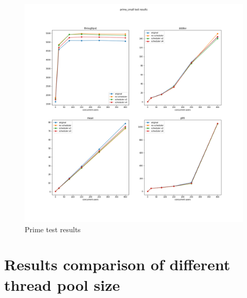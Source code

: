 \begin{figure}[htbp]
	\begin{center}
		\includegraphics[scale=0.3]{figures/prime_small test results.png}
	\end{center}
	\caption{Prime test results}
	\label{prime_small_test_results}
\end{figure}


\section{Results comparison of different thread pool size}

